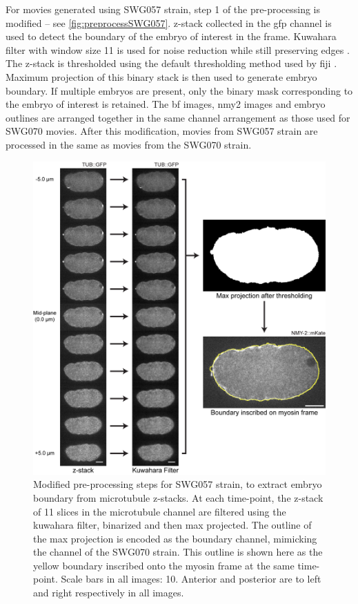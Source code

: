 For movies generated using SWG057 strain, step 1 of the pre-processing is modified --  see \autoref{fig:preprocessSWG057}. z-stack collected in the \ac{gfp} channel is used to detect the boundary of the embryo of interest in the frame. Kuwahara filter with window size \num{11} is used for noise reduction while still preserving edges \citep{kuwahara1976processing}. The z-stack is thresholded using the default thresholding method used by \ac{fiji} \citep{imageJGuide}. Maximum projection of this binary stack is then used to generate embryo boundary. If multiple embryos are present, only the binary mask corresponding to the embryo of interest is retained. The \ac{bf} images, \ac{nmy2} images and embryo outlines are arranged together in the same channel arrangement as those used for SWG070 movies. After this modification, movies from SWG057 strain are processed in the same as movies from the SWG070 strain.

\begin{figure}[p]
\centering
\includegraphics[width=\textwidth]{ExpMethods/FigPreProcess/swg057BoundaryDetect.png}
\caption[Image analysis: pre-processing (SWG057)]{Modified pre-processing steps for SWG057 strain, to extract embryo boundary from microtubule z-stacks. At each time-point, the z-stack of \num{11} slices in the microtubule channel are filtered using the kuwahara filter, binarized and then max projected. The outline of the max projection is encoded as the boundary channel, mimicking the  channel of the SWG070 strain. This outline is shown here as the yellow boundary inscribed onto the myosin frame at the same time-point. Scale bars in all images: \SI{10}{\unitLength}. Anterior and posterior are to left and right respectively in all images.}
\label{fig:preprocessSWG057}
\end{figure}

